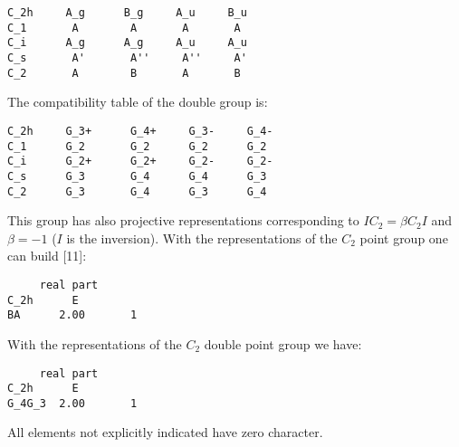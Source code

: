 \documentclass[12pt,a4paper,twoside]{report}
\begin{document}
\begin{tcolorbox}
\begin{footnotesize}
\begin{verbatim}
C_2h     A_g      B_g     A_u     B_u
C_1       A        A       A       A
C_i      A_g      A_g     A_u     A_u
C_s       A'       A''     A''     A'
C_2       A        B       A       B
\end{verbatim}
\end{footnotesize}
\end{tcolorbox}

The compatibility table of the double group is:

\begin{tcolorbox}
\begin{footnotesize}
\begin{verbatim}
C_2h     G_3+      G_4+     G_3-     G_4- 
C_1      G_2       G_2      G_2      G_2
C_i      G_2+      G_2+     G_2-     G_2-
C_s      G_3       G_4      G_4      G_3
C_2      G_3       G_4      G_3      G_4
\end{verbatim}
\end{footnotesize}
\end{tcolorbox}

This group has also projective representations corresponding to
$IC_2 = \beta C_2 I$ and $\beta=-1$ ($I$ is the inversion).
With the representations of the $C_2$ point group one can build [11]:

\begin{tcolorbox}
\begin{footnotesize}
\begin{verbatim}
     real part
C_2h      E     
BA      2.00       1
\end{verbatim}
\end{footnotesize}
\end{tcolorbox}

With the representations of the $C_2$ double point group we have:

\begin{tcolorbox}
\begin{footnotesize}
\begin{verbatim}
     real part
C_2h      E     
G_4G_3  2.00       1
\end{verbatim}
\end{footnotesize}
\end{tcolorbox}

All elements not explicitly indicated have zero character.
\end{document}
